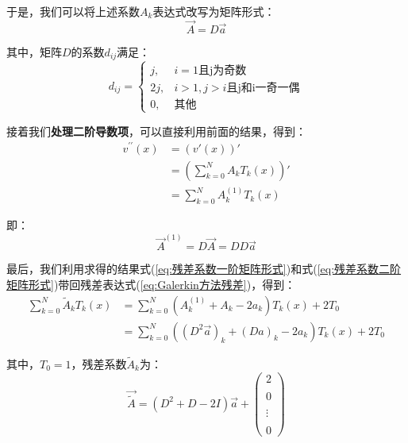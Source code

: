 \documentclass[12pt]{ctexart}
\numberwithin{equation}{section} %
\begin{document}
    于是，我们可以将上述系数$A_k$表达式改写为矩阵形式：
    \begin{equation}
        \vec A=D\vec a
        \label{eq:残差系数一阶矩阵形式}
    \end{equation}

    其中，矩阵$D$的系数$d_{ij}$满足：
    \begin{equation}
        d_{ij}=\begin{cases}j,&i=1\text{且j为奇数}\\2j,&i>1,j>i\text{且j和i一奇一偶}\\0,&\text{其他}\end{cases}
    \end{equation}

    接着我们\textbf{处理二阶导数项}，可以直接利用前面的结果，得到：
    \begin{equation}
        \begin{aligned}
            v^{\prime\prime}(x)& =(v'(x))'  \\
            &=\left(\sum_{k=0}^NA_kT_k(x)\right)' \\
            &=\sum_{k=0}^NA_k^{(1)}T_k(x)
            \end{aligned}
    \end{equation}

    即：
    \begin{equation}
        \vec A^{(1)}=D\vec A=DD\vec a
        \label{eq:残差系数二阶矩阵形式}
    \end{equation}


    最后，我们利用求得的结果式(\ref{eq:残差系数一阶矩阵形式})和式(\ref{eq:残差系数二阶矩阵形式})带回残差表达式(\ref{eq:Galerkin方法残差})，得到：
    \begin{equation}
        \begin{aligned}
            \sum_{k=0}^{N}\tilde{A}_{k}T_{k}(x)& =\sum_{k=0}^N(A_k^{(1)}+A_k-2a_k)T_k(x)+2T_0  \\
            &=\sum_{k=0}^N((D^2\vec{a})_k+(Da)_k-2a_k)T_k(x)+2T_0
            \end{aligned}
        \label{eq:Galerkin方法残差最终表达式}
    \end{equation}

    其中，$T_0=1$，残差系数$\tilde{A}_k$为：
    \begin{equation}
        \vec{\tilde{A}}=(D^2+D-2I)\vec{a}+\left(\begin{array}{c}2\\\\0\\\\\vdots\\\\0\end{array}\right)
        \label{eq:Galerkin方法残差系数矩阵形式}
    \end{equation}
\end{document}
